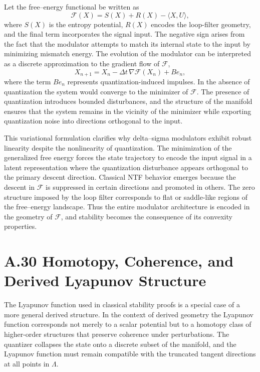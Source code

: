 Let the free–energy functional be written as
\[
\mathcal{F}(X) = S(X) + R(X) - \langle X, U \rangle,
\]
where \(S(X)\) is the entropy potential, \(R(X)\) encodes the loop-filter geometry, and the final term incorporates the signal input. The negative sign arises from the fact that the modulator attempts to match its internal state to the input by minimizing mismatch energy. The evolution of the modulator can be interpreted as a discrete approximation to the gradient flow of \(\mathcal{F}\),
\[
X_{n+1} = X_n - \Delta t \, \nabla \mathcal{F}(X_n) + B e_n,
\]
where the term \(B e_n\) represents quantization-induced impulses. In the absence of quantization the system would converge to the minimizer of \(\mathcal{F}\). The presence of quantization introduces bounded disturbances, and the structure of the manifold ensures that the system remains in the vicinity of the minimizer while exporting quantization noise into directions orthogonal to the input.

This variational formulation clarifies why delta–sigma modulators exhibit robust linearity despite the nonlinearity of quantization. The minimization of the generalized free energy forces the state trajectory to encode the input signal in a latent representation where the quantization disturbance appears orthogonal to the primary descent direction. Classical NTF behavior emerges because the descent in \(\mathcal{F}\) is suppressed in certain directions and promoted in others. The zero structure imposed by the loop filter corresponds to flat or saddle-like regions of the free–energy landscape. Thus the entire modulator architecture is encoded in the geometry of \(\mathcal{F}\), and stability becomes the consequence of its convexity properties.

\section{A.30 Homotopy, Coherence, and Derived Lyapunov Structure}

The Lyapunov function used in classical stability proofs is a special case of a more general derived structure. In the context of derived geometry the Lyapunov function corresponds not merely to a scalar potential but to a homotopy class of higher-order structures that preserve coherence under perturbations. The quantizer collapses the state onto a discrete subset of the manifold, and the Lyapunov function must remain compatible with the truncated tangent directions at all points in \(\Lambda\).

